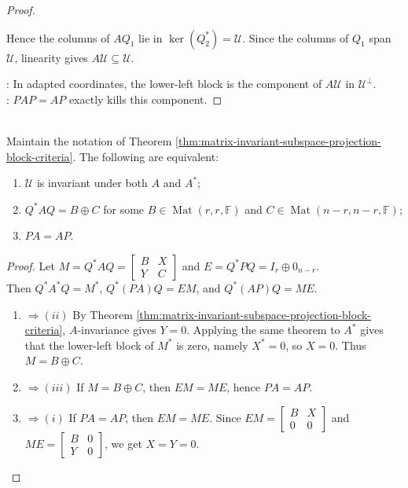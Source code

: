\begin{theorem}
\begin{proof}
\begin{enumerate}[label=(\roman*).]
Hence the columns of $AQ_1$ lie in $\ker(Q_2^*)=\mathcal{U}$. Since the columns of $Q_1$ span $\mathcal{U}$, linearity gives $A\mathcal{U}\subseteq\mathcal{U}$.
\end{enumerate}
: In adapted coordinates, the lower-left block is the component of $A\mathcal{U}$ in $\mathcal{U}^{\perp}$.\\
: $PAP=AP$ exactly kills this component.
\end{proof}
\end{theorem}

\begin{corollary} \label{cor:reducing-subspace-projection-commutation} \\
Maintain the notation of Theorem \ref{thm:matrix-invariant-subspace-projection-block-criteria}. The following are equivalent:
\begin{enumerate}[label=(\roman*)]
\setlength{\itemsep}{0pt}
\item $\mathcal{U}$ is invariant under both $A$ and $A^*$;
\item $Q^*AQ=B\oplus C$ for some $B\in\operatorname{Mat}(r,r,\mathbb{F})$ and $C\in\operatorname{Mat}(n-r,n-r,\mathbb{F})$;
\item $PA=AP$.
\end{enumerate}
\begin{proof} Let $M=Q^*AQ=\begin{bmatrix}B&X\\Y&C\end{bmatrix}$ and $E=Q^*PQ=I_r\oplus0_{n-r}$.\\
Then $Q^*A^*Q=M^*$, $Q^*(PA)Q=EM$, and $Q^*(AP)Q=ME$.
\begin{enumerate}[label=(\roman*).]
\setlength{\itemsep}{0pt}
\item[$(i)$] $\Rightarrow (ii)$ By Theorem \ref{thm:matrix-invariant-subspace-projection-block-criteria}, $A$-invariance gives $Y=0$. Applying the same theorem to $A^*$ gives that the lower-left block of $M^*$ is zero, namely $X^*=0$, so $X=0$. Thus $M=B\oplus C$.
\item[$(ii)$] $\Rightarrow (iii)$ If $M=B\oplus C$, then $EM=ME$, hence $PA=AP$.
\item[$(iii)$] $\Rightarrow (i)$ If $PA=AP$, then $EM=ME$. Since $EM=\begin{bmatrix}B&X\\0&0\end{bmatrix}$ and $ME=\begin{bmatrix}B&0\\Y&0\end{bmatrix}$, we get $X=Y=0$.\\

\end{enumerate}
\end{proof}
\end{corollary}
